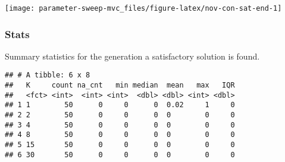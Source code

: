\documentclass[]{book}
\newenvironment{Shaded}{\begin{snugshade}}{\end{snugshade}}
\newcommand{\DataTypeTok}[1]{\textcolor[rgb]{0.13,0.29,0.53}{#1}}
\newcommand{\DecValTok}[1]{\textcolor[rgb]{0.00,0.00,0.81}{#1}}
\newcommand{\KeywordTok}[1]{\textcolor[rgb]{0.13,0.29,0.53}{\textbf{#1}}}
\newcommand{\NormalTok}[1]{#1}
\newcommand{\OperatorTok}[1]{\textcolor[rgb]{0.81,0.36,0.00}{\textbf{#1}}}
\newcommand{\OtherTok}[1]{\textcolor[rgb]{0.56,0.35,0.01}{#1}}
\newcommand{\StringTok}[1]{\textcolor[rgb]{0.31,0.60,0.02}{#1}}
\begin{document}
\texttt{[image: parameter-sweep-mvc\_files/figure-latex/nov-con-sat-end-1]}

\hypertarget{stats-55}{%
\subsubsection{Stats}\label{stats-55}}

Summary statistics for the generation a satisfactory solution is found.

\begin{Shaded}
\end{Shaded}

\begin{verbatim}
## # A tibble: 6 x 8
##   K     count na_cnt   min median  mean   max   IQR
##   <fct> <int>  <int> <int>  <dbl> <dbl> <int> <dbl>
## 1 1        50      0     0      0  0.02     1     0
## 2 2        50      0     0      0  0        0     0
## 3 4        50      0     0      0  0        0     0
## 4 8        50      0     0      0  0        0     0
## 5 15       50      0     0      0  0        0     0
## 6 30       50      0     0      0  0        0     0
\end{verbatim}
\end{document}
